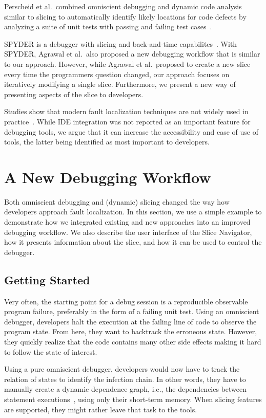 \documentclass[
			english,
			review,
			]{elsarticle}
\begin{document}
Perscheid et al.\ combined omniscient debugging and dynamic code analysis similar to slicing to automatically identify likely locations for code defects by analyzing a suite of unit tests with passing and failing test cases~\cite{perscheid_testdriven_2013}.

SPYDER is a debugger with slicing and back-and-time capabilites~\cite{agrawal_debugging_1993}.
With SPYDER, Agrawal et al.\ also proposed a new debugging workflow that is similar to our approach.
However, while Agrawal et al.\ proposed to create a new slice every time the programmers question changed, our approach focuses on iteratively modifying a single slice.
Furthermore, we present a new way of presenting aspects of the slice to developers.

Studies show that modern fault localization techniques are not widely used in practice~\cite{perscheid_studying_2017}.
While IDE integration was not reported as an important feature for debugging tools, we argue that it can increase the accessibility and ease of use of tools, the latter being identified as most important to developers.

\section{A New Debugging Workflow}
\label{sec:workflow}

Both omniscient debugging and (dynamic) slicing changed the way how developers approach fault localization.
In this section, we use a simple example to demonstrate how we integrated existing and new approaches into an improved debugging workflow.
We also describe the user interface of the Slice Navigator, how it presents information about the slice, and how it can be used to control the debugger.

\subsection{Getting Started}

Very often, the starting point for a debug session is a reproducible observable program failure, preferably in the form of a failing unit test.
Using an omniscient debugger, developers halt the execution at the failing line of code to observe the program state.
From here, they want to backtrack the erroneous state.
However, they quickly realize that the code contains many other side effects making it hard to follow the state of interest.

Using a pure omniscient debugger, developers would now have to track the relation of states to identify the infection chain. 
In other words, they have to manually create a dynamic dependence graph, i.e., the dependencies between statement executions~\cite{agrawal_dynamic_1990}, using only their short-term memory. 
When slicing features are supported, they might rather leave that task to the tools.
\end{document}
